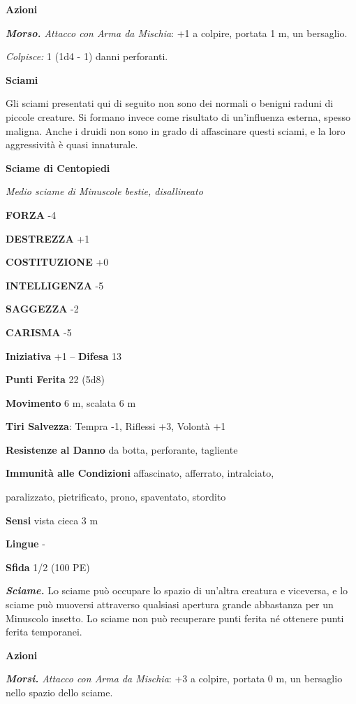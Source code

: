 \begin{multicols}{2}
\textbf{Azioni}

\emph{\textbf{Morso.} Attacco con Arma da Mischia}: +1 a colpire, portata 1 m, un bersaglio.

\emph{Colpisce:} 1 (1d4 - 1) danni perforanti.

\medskip\textbf{Sciami}

Gli sciami presentati qui di seguito non sono dei normali o benigni raduni di piccole creature. Si formano invece come risultato di un'influenza esterna, spesso maligna. Anche i druidi non sono in grado di affascinare questi sciami, e la loro aggressività è quasi innaturale. 

\textbf{Sciame di Centopiedi}

\emph{Medio sciame di Minuscole bestie, disallineato}

\textbf{FORZA} -4

\textbf{DESTREZZA} +1

\textbf{COSTITUZIONE} +0

\textbf{INTELLIGENZA} -5

\textbf{SAGGEZZA} -2

\textbf{CARISMA} -5

\textbf{Iniziativa} +1 -- \textbf{Difesa} 13

\textbf{Punti Ferita} 22 (5d8)

\textbf{Movimento} 6 m, scalata 6 m

\textbf{Tiri Salvezza}: Tempra -1, Riflessi +3, Volontà +1

\textbf{Resistenze al Danno} da botta, perforante, tagliente

\textbf{Immunità alle Condizioni} affascinato, afferrato, intralciato,

paralizzato, pietrificato, prono, spaventato, stordito

\textbf{Sensi} vista cieca 3 m 

\textbf{Lingue} -

\textbf{Sfida} 1/2 (100 PE)

\emph{\textbf{Sciame.}} Lo sciame può occupare lo spazio di un'altra creatura e viceversa, e lo sciame può muoversi attraverso qualsiasi apertura grande abbastanza per un Minuscolo insetto. Lo sciame non può recuperare punti ferita né ottenere punti ferita temporanei.

\textbf{Azioni}

\emph{\textbf{Morsi.} Attacco con Arma da Mischia}: +3 a colpire, portata 0 m, un bersaglio nello spazio dello sciame. 


\end{multicols}
